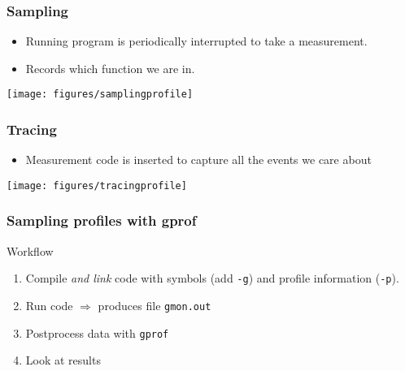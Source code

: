 \documentclass[presentation,aspectratio=43,10pt]{beamer}
\begin{document}
\begin{frame}
  \frametitle{Sampling}
  \begin{itemize}
  \item Running program is periodically interrupted to take a measurement.
  \item Records which function we are in.
  \end{itemize}
  \begin{center}
    \texttt{[image: figures/samplingprofile]}
  \end{center}
\end{frame}
\begin{frame}
  \frametitle{Tracing}
  \begin{itemize}
  \item Measurement code is inserted to capture all the events we care
    about
  \end{itemize}
  \begin{center}
    \texttt{[image: figures/tracingprofile]}
  \end{center}
\end{frame}


\begin{frame}
  \frametitle{Sampling profiles with gprof}
  \begin{exampleblock}{Workflow}
    \begin{enumerate}
    \item Compile \emph{and link} code with symbols (add \texttt{-g}) and profile
      information (\texttt{-p}).
    \item Run code $\Rightarrow$ produces file \texttt{gmon.out}
    \item Postprocess data with \texttt{gprof}
    \item Look at results
    \end{enumerate}
  \end{exampleblock}
\end{frame}
\end{document}
